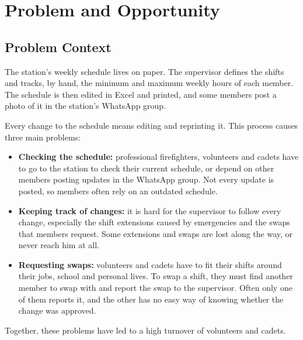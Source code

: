 \documentclass[11pt,a4paper]{article}
\let\oldsection\section
\renewcommand{\section}{\clearpage\oldsection}
\begin{document}
\tableofcontents
\listoffigures
\listoftables

\section{Problem and Opportunity}

\subsection{Problem Context}
The station's weekly schedule lives on paper. The supervisor defines the shifts and tracks,
by hand, the minimum and maximum weekly hours of each member. The schedule is then edited in
Excel and printed, and some members post a photo of it in the station's WhatsApp group.

Every change to the schedule means editing and reprinting it. This process causes three
main problems:
\begin{itemize}
  \item \textbf{Checking the schedule:} professional firefighters, volunteers and cadets have
        to go to the station to check their current schedule, or depend on other members
        posting updates in the WhatsApp group. Not every update is posted, so members often
        rely on an outdated schedule.
  \item \textbf{Keeping track of changes:} it is hard for the supervisor to follow every
        change, especially the shift extensions caused by emergencies and the swaps that
        members request. Some extensions and swaps are lost along the way, or never reach him
        at all.
  \item \textbf{Requesting swaps:} volunteers and cadets have to fit their shifts around their
        jobs, school and personal lives. To swap a shift, they must find another member to
        swap with and report the swap to the supervisor. Often only one of them reports it,
        and the other has no easy way of knowing whether the change was approved.
\end{itemize}

Together, these problems have led to a high turnover of volunteers and cadets.
\end{document}

